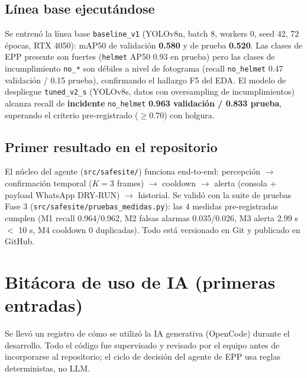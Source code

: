 \documentclass[conference,spanish]{IEEEtran}
\begin{document}
\subsection{Línea base ejecutándose}
Se entrenó la línea base \texttt{baseline\_v1} (YOLOv8n, batch 8, workers 0, seed 42, 72 épocas, RTX 4050): mAP50 de validación \textbf{0.580} y de prueba \textbf{0.520}. Las clases de EPP presente son fuertes (\texttt{helmet} AP50 0.93 en prueba) pero las clases de incumplimiento \texttt{no\_*} son débiles a nivel de fotograma (recall \texttt{no\_helmet} 0.47 validación / 0.15 prueba), confirmando el hallazgo F5 del EDA. El modelo de despliegue \texttt{tuned\_v2\_s} (YOLOv8s, datos con oversampling de incumplimientos) alcanza recall de \textbf{incidente} \texttt{no\_helmet} \textbf{0.963 validación / 0.833 prueba}, superando el criterio pre-registrado ($\geq 0.70$) con holgura.

\subsection{Primer resultado en el repositorio}
El núcleo del agente (\texttt{src/safesite/}) funciona end-to-end: percepción $\rightarrow$ confirmación temporal ($K=3$ frames) $\rightarrow$ cooldown $\rightarrow$ alerta (consola + payload WhatsApp DRY-RUN) $\rightarrow$ historial. Se validó con la suite de pruebas Fase 3 (\texttt{src/safesite/pruebas\_medidas.py}): las 4 medidas pre-registradas cumplen (M1 recall 0.964/0.962, M2 falsas alarmas 0.035/0.026, M3 alerta 2.99 s $<$ 10 s, M4 cooldown 0 duplicadas). Todo está versionado en Git y publicado en GitHub.

\section{Bitácora de uso de IA (primeras entradas)}

Se llevó un registro de cómo se utilizó la IA generativa (OpenCode) durante el desarrollo. Todo el código fue supervisado y revisado por el equipo antes de incorporarse al repositorio; el ciclo de decisión del agente de EPP usa reglas deterministas, no LLM.
\end{document}
